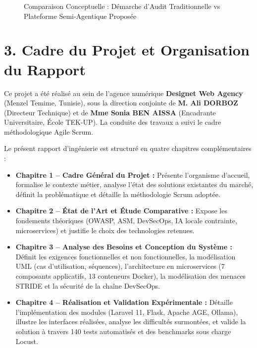 \begin{figure}[H]
\caption{Comparaison Conceptuelle : D\'emarche d'Audit Traditionnelle vs Plateforme Semi-Agentique Propos\'ee}
\label{fig:intro_conceptuelle}
\end{figure}

\section*{3. Cadre du Projet et Organisation du Rapport}
\par Ce projet a \'et\'e r\'ealis\'e au sein de l'agence num\'erique \textbf{Designet Web Agency} (Menzel Temime, Tunisie), sous la direction conjointe de \textbf{M. Ali DORBOZ} (Directeur Technique) et de \textbf{Mme Sonia BEN AISSA} (Encadrante Universitaire, \'Ecole TEK-UP). La conduite des travaux a suivi le cadre m\'ethodologique Agile Scrum.
\par Le pr\'esent rapport d'ing\'enierie est structur\'e en quatre chapitres compl\'ementaires :
\begin{itemize}
    \item \textbf{Chapitre 1 -- Cadre G\'en\'eral du Projet :} Pr\'esente l'organisme d'accueil, formalise le contexte m\'etier, analyse l'\'etat des solutions existantes du march\'e, d\'efinit la probl\'ematique et d\'etaille la m\'ethodologie Scrum adopt\'ee.
    \item \textbf{Chapitre 2 -- \'Etat de l'Art et \'Etude Comparative :} Expose les fondements th\'eoriques (OWASP, ASM, DevSecOps, IA locale contrainte, microservices) et justifie le choix des technologies retenues.
    \item \textbf{Chapitre 3 -- Analyse des Besoins et Conception du Syst\`eme :} D\'efinit les exigences fonctionnelles et non fonctionnelles, la mod\'elisation UML (cas d'utilisation, s\'equences), l'architecture en microservices (7 composants applicatifs, 13 conteneurs Docker), la mod\'elisation des menaces STRIDE et la s\'ecurit\'e de la cha\^ine DevSecOps.
    \item \textbf{Chapitre 4 -- R\'ealisation et Validation Exp\'erimentale :} D\'etaille l'impl\'ementation des modules (Laravel 11, Flask, Apache AGE, Ollama), illustre les interfaces r\'ealis\'ees, analyse les difficult\'es surmont\'ees, et valide la solution \`a travers 140 tests automatis\'es et des benchmarks sous charge Locust.
\end{itemize}
